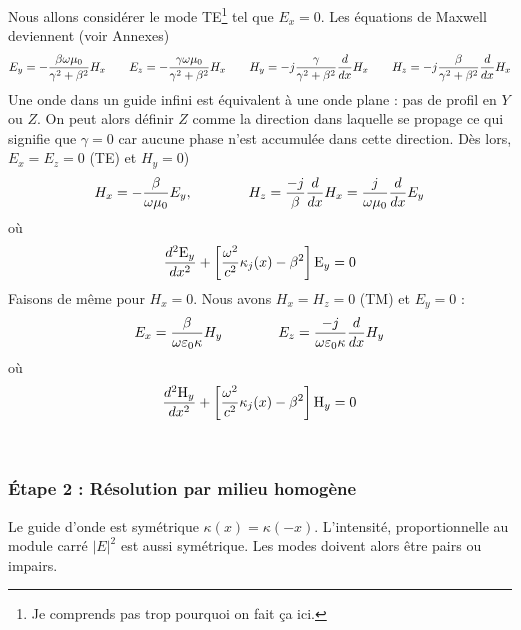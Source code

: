 Nous allons considérer le mode TE\footnote{Je comprends pas trop pourquoi on fait ça ici.} tel que $E_x=0$. Les équations de Maxwell deviennent (voir Annexes)
\begin{equation}
{E_y} =  - \frac{{\beta {\rm{ }}\omega {\rm{ }}{\mu _0}}}{{{\gamma ^2} + {\beta ^2}}}{\rm{ }}{H_x}\qquad
{E_z} =  - \frac{{\gamma {\rm{ }}\omega {\rm{ }}{\mu _0}}}{{{\gamma ^2} + {\beta ^2}}}{\rm{ }}{H_x}\qquad
{H_y} =  - j\frac{\gamma }{{{\gamma ^2} + {\beta ^2}}}{\rm{ }}\frac{d}{{dx}}{H_x}\qquad
{H_z} =  - j\frac{\beta }{{{\gamma ^2} + {\beta ^2}}}{\rm{ }}\frac{d}{{dx}}{H_x}
\end{equation}
Une onde dans un guide infini est équivalent à une onde plane : pas de profil en $Y$ ou $Z$. On peut
alors définir $Z$ comme la direction dans laquelle se propage ce qui signifie que $\gamma=0$ car 
aucune phase n'est accumulée dans cette direction. Dès lors, $E_x=E_z=0$ (TE) et $H_y=0$)
\begin{equation}
{H_x} =  - \frac{{\beta {\rm{ }}}}{{\omega {\rm{ }}{\mu _0}}}{\rm{ }}{E_y},\qquad\qquad
{H_z} = \frac{{ - j}}{\beta }{\rm{ }}\frac{d}{{dx}}{H_x} = \frac{j}{{\omega {\rm{ }}{\mu _0}}}\frac{d}{{dx}}{E_y}
\end{equation}
où
\begin{equation}
\frac{{{d^2}{{\rm{E}}_y}}}{{d{x^2}}} + \left[ {\frac{{{\omega ^2}}}{{{c^2}}}{\kappa _j}(x) - {\beta ^2}} \right]{{\rm{E}}_y} = 0
\end{equation}
Faisons de même pour $H_x=0$. Nous avons $H_x=H_z=0$ (TM) et $E_y=0$ :
\begin{equation}
{E_x} = \frac{{\beta {\rm{ }}}}{{\omega {\rm{ }}{\varepsilon _0}{\rm{ }}\kappa }}{\rm{ }}{H_y}\qquad\qquad
{E_z} = \frac{{ - j}}{{\omega {\rm{ }}{\varepsilon _0}{\rm{ }}\kappa }}{\rm{ }}\frac{d}{{dx}}{H_y}
\end{equation}
où
\begin{equation}
\frac{{{d^2}{{\rm{H}}_y}}}{{d{x^2}}} + \left[ {\frac{{{\omega ^2}}}{{{c^2}}}{\kappa _j}(x) - {\beta ^2}} \right]{{\rm{H}}_y} = 0
\end{equation}

\ \\


\subsubsection{Étape 2 : Résolution par milieu homogène}
Le guide d'onde est symétrique $\kappa(x)=\kappa(-x)$. L'intensité, proportionnelle au module carré 
$|E|^2$ est aussi symétrique. Les modes doivent alors être pairs ou impairs.\\

